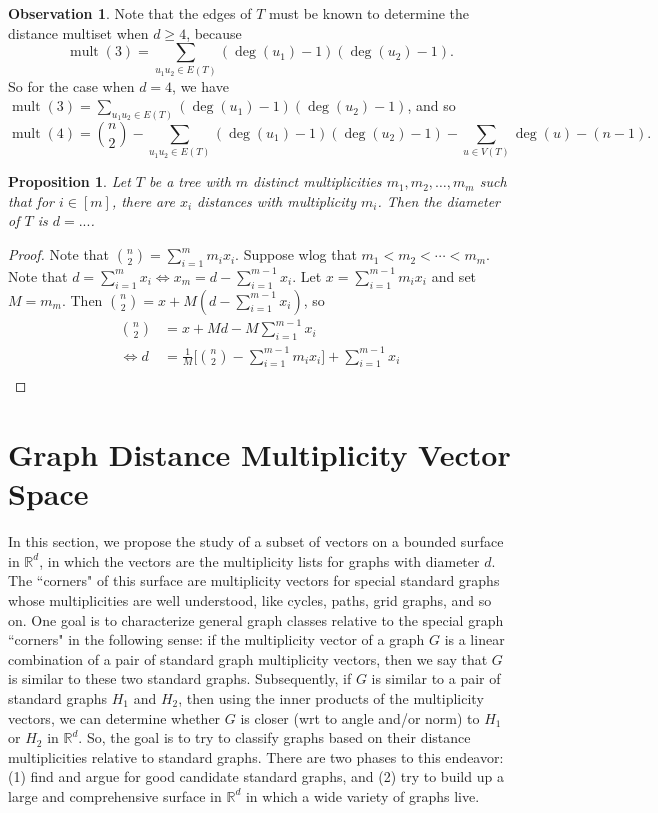 \documentclass[12]{article}
\newcommand{\R}{\mathbb{R}}
\DeclareMathOperator{\mult}{mult}
\newtheorem{prop}[thm]{Proposition}
\theoremstyle{definition}
\newtheorem{obs}{Observation}
\begin{document}
	\begin{obs}
		Note that the edges of $T$ must be known to determine the distance multiset when $d \geq 4$, because 
		$$\mult(3) = \sum_{u_1u_2 \in E(T)}(\deg(u_1)-1)(\deg(u_2)-1).$$  
		So for the case when $d=4$, we have $\mult(3) = \sum_{u_1u_2 \in E(T)}(\deg(u_1)-1)(\deg(u_2)-1)$, and so 
		$$\mult(4) = {n \choose 2} - \sum_{u_1u_2 \in E(T)}(\deg(u_1)-1)(\deg(u_2)-1) - \sum_{u \in V(T)}\deg(u) - (n-1).$$
	\end{obs}
	
	\begin{prop}
		Let $T$ be a tree with $m$ distinct multiplicities $m_1, m_2, \ldots, m_m$ such that for $i \in [m]$, there are $x_i$ distances with multiplicity $m_i$.  Then the diameter of $T$ is $d = ...$.
	\end{prop}

	\begin{proof}
		Note that ${n \choose 2} = \sum_{i=1}^m m_ix_i$.  Suppose wlog that $m_1 < m_2 < \cdots < m_m$.  Note that $d = \sum_{i=1}^m x_i \Leftrightarrow x_m = d - \sum_{i=1}^{m-1}x_i$.  Let $x = \sum_{i=1}^{m-1}m_ix_i$ and set $M = m_m$.  Then ${n \choose 2} = x + M(d-\sum_{i=1}^{m-1}x_i)$, so
		\begin{align*}
			{n \choose 2} &= x + Md - M\sum_{i=1}^{m-1}x_i	\\
			\Leftrightarrow d &= \frac{1}{M}\biggr[{n \choose 2} - \sum_{i=1}^{m-1}m_ix_i\biggr] + \sum_{i=1}^{m-1}x_i 	\\
		\end{align*}
	\end{proof}
	
	\section{Graph Distance Multiplicity Vector Space}
	
	In this section, we propose the study of a subset of vectors on a bounded surface in $\R^d$, in which the vectors are the multiplicity lists for graphs with diameter $d$.  The ``corners" of this surface are multiplicity vectors for special standard graphs whose multiplicities are well understood, like cycles, paths, grid graphs, and so on.  One goal is to characterize general graph classes relative to the special graph ``corners" in the following sense: if the multiplicity vector of a graph $G$ is a linear combination of a pair of standard graph multiplicity vectors, then we say that $G$ is similar to these two standard graphs.  Subsequently, if $G$ is similar to a pair of standard graphs $H_1$ and $H_2$, then using the inner products of the multiplicity vectors, we can determine whether $G$ is closer (wrt to angle and/or norm) to $H_1$ or $H_2$ in $\R^d$.  So, the goal is to try to classify graphs based on their distance multiplicities relative to standard graphs.  There are two phases to this endeavor: (1) find and argue for good candidate standard graphs, and (2) try to build up a large and comprehensive surface in $\R^d$ in which a wide variety of graphs live.
	
\end{document}
